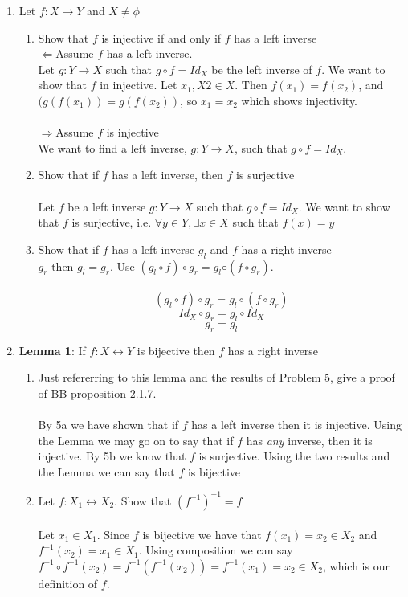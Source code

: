 \documentclass[11pt]{article}
\begin{document}
\begin{enumerate}
\item Let $f:X \to Y$ and $X \neq \phi$
\begin{enumerate}
\item Show that $f$ is injective if and only if $f$ has a left inverse\\
$\Leftarrow$Assume $f$ has a left inverse.\\
Let $g : Y \to X$ such that $g \circ f = Id_X$ be the left inverse of $f$.  We want to show that $f$ in injective.  Let $x_1, X2 \in X$.  Then $f(x_1) = f(x_2)$, and $(g(f(x_1)) = g(f(x_2))$, so $x_1 = x_2$ which shows injectivity.\\\\
$\Rightarrow$Assume $f$ is injective\\
We want to find a left inverse, $g : Y \to X$, such that $g \circ f = Id_X$.
\item Show that if $f$ has a left inverse, then $f$ is surjective\\\\
Let $f$ be a left inverse $g : Y \to X$ such that  $g \circ f = Id_X$.  We want to show that $f$ is surjective, i.e. $\forall y \in Y, \exists x \in X$ such that $f(x) = y$
\\
\item Show that if $f$ has a left inverse $g_l$ and $f$ has a right inverse\\
$g_r$ then $g_l = g_r$. Use $(g_l \circ f) \circ g_r = g_l ◦ (f \circ g_r )$.\\
\\
$$(g_l \circ f) \circ g_r = g_l \circ (f \circ g_r)$$
$$Id_X \circ g_r = g_l \circ Id_X$$
$$g_r = g_l$$
\end{enumerate} %

\newpage
\item \textbf{Lemma 1}: If $f:X \leftrightarrow Y$ is bijective then $f$ has a right inverse
\begin{enumerate}
\item Just refererring to this lemma and the results of Problem 5, give a proof of BB proposition 2.1.7.\\
\\
By 5a we have shown that if $f$ has a left inverse then it is injective.  Using the Lemma we may go on to say that if $f$ has \emph{any} inverse, then it is injective.  By 5b we know that $f$ is surjective.  Using the two results and the Lemma we can say that $f$ is bijective\\
\item Let $f: X_1 \leftrightarrow X_2$.  Show that $(f^{-1})^{-1} = f$\\\\
Let $x_1 \in X_1$.  Since $f$ is bijective we have that $f(x_1) = x_2 \in X_2$ and $f^{-1}(x_2) = x_1 \in X_1$.  Using composition we can say $f^{-1} \circ f^{-1}(x_2) = f^{-1}(f^{-1}(x_2)) = f^{-1}(x_1) = x_2 \in X_2$, which is our definition of $f$.
\end{enumerate}


\end{enumerate}
\end{document}
